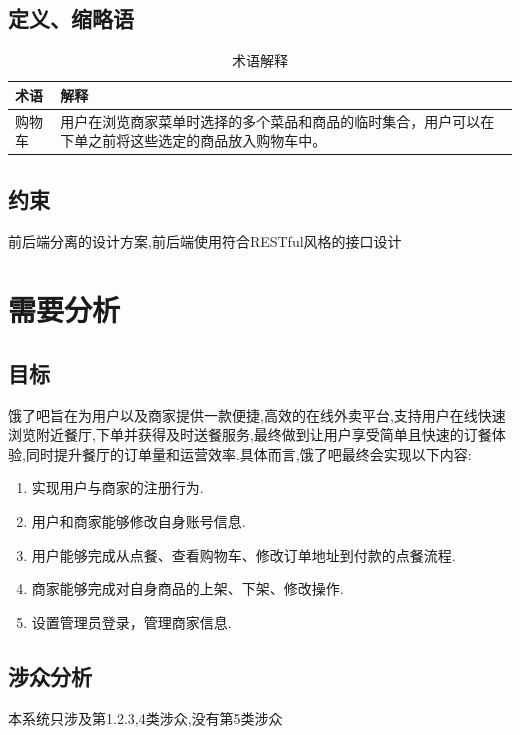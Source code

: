 \subsection{ 定义、缩略语}


\begin{table}[h]
    \centering
    \begin{tabularx}{0.8\linewidth}{|l|X|}
    \hline
        \textbf{术语} & \textbf{解释}\\ \hline
        购物车 &用户在浏览商家菜单时选择的多个菜品和商品的临时集合，用户可以在下单之前将这些选定的商品放入购物车中。  \\
    \hline
    \end{tabularx}
    \caption{术语解释}
    \label{tab:sy}
\end{table}

\subsection{约束}
    前后端分离的设计方案,前后端使用符合RESTful风格的接口设计
\section{需要分析}

\subsection{目标}
饿了吧旨在为用户以及商家提供一款便捷,高效的在线外卖平台,支持用户在线快速浏览附近餐厅,下单并获得及时送餐服务,最终做到让用户享受简单且快速的订餐体验,同时提升餐厅的订单量和运营效率.具体而言,饿了吧最终会实现以下内容:
  \begin{enumerate}
      \item  实现用户与商家的注册行为.
      \item  用户和商家能够修改自身账号信息.
      \item  用户能够完成从点餐、查看购物车、修改订单地址到付款的点餐流程.
      \item  商家能够完成对自身商品的上架、下架、修改操作.
      \item  设置管理员登录，管理商家信息.
  \end{enumerate}

\subsection{涉众分析}
本系统只涉及第1.2.3,4类涉众,没有第5类涉众

